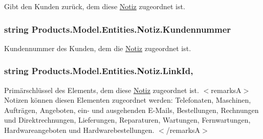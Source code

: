 Gibt den Kunden zurück, dem diese \hyperlink{class_products_1_1_model_1_1_entities_1_1_notiz}{Notiz} zugeordnet ist. 

\subsubsection[{\texorpdfstring{Kundennummer}{Kundennummer}}]{\setlength{\rightskip}{0pt plus 5cm}string Products.\+Model.\+Entities.\+Notiz.\+Kundennummer\hspace{0.3cm}{\ttfamily [get]}}\hypertarget{class_products_1_1_model_1_1_entities_1_1_notiz_a1dca63fdabb5a1d023ead81c9a628d7b}{}\label{class_products_1_1_model_1_1_entities_1_1_notiz_a1dca63fdabb5a1d023ead81c9a628d7b}


Kundennummer des Kunden, dem die \hyperlink{class_products_1_1_model_1_1_entities_1_1_notiz}{Notiz} zugeordnet ist. 

\subsubsection[{\texorpdfstring{Link\+Id}{LinkId}}]{\setlength{\rightskip}{0pt plus 5cm}string Products.\+Model.\+Entities.\+Notiz.\+Link\+Id\hspace{0.3cm}{\ttfamily [get]}, {\ttfamily [set]}}\hypertarget{class_products_1_1_model_1_1_entities_1_1_notiz_aeb7c1d598ed2869ffd90f8878935ade8}{}\label{class_products_1_1_model_1_1_entities_1_1_notiz_aeb7c1d598ed2869ffd90f8878935ade8}


Primärschlüssel des Elements, dem diese \hyperlink{class_products_1_1_model_1_1_entities_1_1_notiz}{Notiz} zugeordnet ist. $<$remarks\+A$>$ Notizen können diesen Elementen zugeordnet werden\+: Telefonaten, Maschinen, Aufträgen, Angeboten, ein-\/ und ausgehenden E-\/\+Mails, Bestellungen, Rechnungen und Direktrechnungen, Lieferungen, Reparaturen, Wartungen, Fernwartungen, Hardwareangeboten und Hardwarebestellungen. $<$/remarks\+A$>$ 

